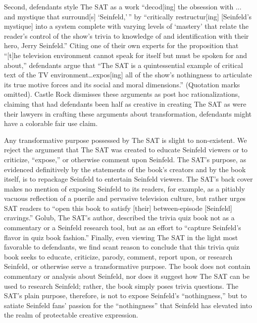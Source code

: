 Second, defendants style The SAT as a work ``decod[ing] the obsession with ...
and mystique that surround[s] `Seinfeld,'\,'' by ``critically
restructur[ing] [Seinfeld's mystique] into a system complete with varying
levels of `mastery' that relate the reader's control of the
show's trivia to knowledge of and identification with their hero, Jerry
Seinfeld.'' Citing one of their own experts for the proposition that ``[t]he
television environment cannot speak for itself but must be spoken for and
about,'' defendants argue that ``The SAT is a quintessential example of
critical text of the TV environment\ldots expos[ing] all of the show's
nothingness to articulate its true motive forces and its social and moral
dimensions.'' (Quotation marks omitted). Castle Rock dismisses these arguments
as post hoc rationalizations, claiming that had defendants been half as
creative in creating The SAT as were their lawyers in crafting these arguments
about transformation, defendants might have a colorable fair use claim.

Any transformative purpose possessed by The SAT is slight to non-existent. We
reject the argument that The SAT was created to educate Seinfeld viewers or to
criticize, ``expose,'' or otherwise comment upon Seinfeld. The SAT's purpose,
as evidenced definitively by the statements of the book's creators and by the
book itself, is to repackage Seinfeld to entertain Seinfeld viewers. The SAT's
back cover makes no mention of exposing Seinfeld to its readers, for example,
as a pitiably vacuous reflection of a puerile and pervasive television culture,
but rather urges SAT readers to ``open this book to satisfy [their]
between-episode [Seinfeld] cravings.'' Golub, The SAT's author, described the
trivia quiz book not as a commentary or a Seinfeld research tool, but as an
effort to ``capture Seinfeld's flavor in quiz book fashion.'' Finally, even
viewing The SAT in the light most favorable to defendants, we find scant reason
to conclude that this trivia quiz book seeks to educate, criticize, parody,
comment, report upon, or research Seinfeld, or otherwise serve a transformative
purpose. The book does not contain commentary or analysis
about Seinfeld, nor does it suggest how The SAT can be used to research
Seinfeld; rather, the book simply poses trivia questions. The SAT's plain
purpose, therefore, is not to expose Seinfeld's ``nothingness,'' but to satiate
Seinfeld fans' passion for the ``nothingness'' that Seinfeld has elevated into
the realm of protectable creative expression.

